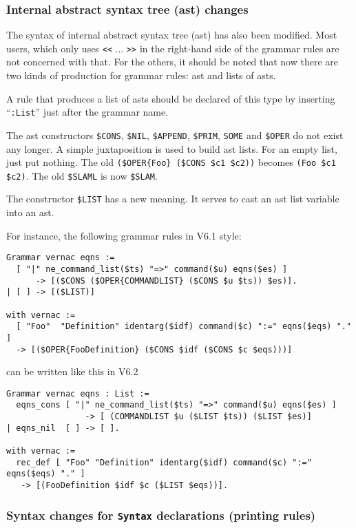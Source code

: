 \documentclass[11pt]{article}
\begin{document}
\begin{coq_example*}
\subsubsection{Internal abstract syntax tree (ast) changes}

The syntax of internal abstract syntax tree (ast) has also been
modified. Most users, which only uses \verb|<<| ... \verb|>>| in the
right-hand side of the grammar rules are not concerned with that.
For the others, it should be noted that now there are two kinds of
production for grammar rules: ast and lists of asts.

A rule that produces a list of asts should be declared of this type by
inserting ``\texttt{:List}'' just after the grammar name.

The ast constructors \verb!$CONS!, \verb!$NIL!, \verb!$APPEND!,
\verb!$PRIM!, \verb!SOME!  and \verb!$OPER! do not
exist any longer. A simple juxtaposition is used to build ast lists. 
For an empty
list, just put nothing. The old \verb!($OPER{Foo} ($CONS $c1 $c2))!
becomes \verb!(Foo $c1 $c2)!. The old \verb!$SLAML! is now \verb!$SLAM!.

The constructor \verb!$LIST! has a new meaning. It serves to cast an
ast list variable into an ast.

For instance, the following grammar rules in V6.1 style:
\begin{verbatim}
Grammar vernac eqns :=
  [ "|" ne_command_list($ts) "=>" command($u) eqns($es) ]
      -> [($CONS ($OPER{COMMANDLIST} ($CONS $u $ts)) $es)].
| [ ] -> [($LIST)]

with vernac :=
  [ "Foo"  "Definition" identarg($idf) command($c) ":=" eqns($eqs) "." ]
  -> [($OPER{FooDefinition} ($CONS $idf ($CONS $c $eqs)))]
\end{verbatim}
can be written like this in V6.2
\begin{verbatim}
Grammar vernac eqns : List :=
  eqns_cons [ "|" ne_command_list($ts) "=>" command($u) eqns($es) ]
                -> [ (COMMANDLIST $u ($LIST $ts)) ($LIST $es)]
| eqns_nil  [ ] -> [ ].

with vernac :=
  rec_def [ "Foo" "Definition" identarg($idf) command($c) ":=" eqns($eqs) "." ]
   -> [(FooDefinition $idf $c ($LIST $eqs))].
\end{verbatim}


\subsubsection{Syntax changes for \texttt{Syntax} declarations 
  (printing rules)}


\end{coq_example*}
\end{document}
